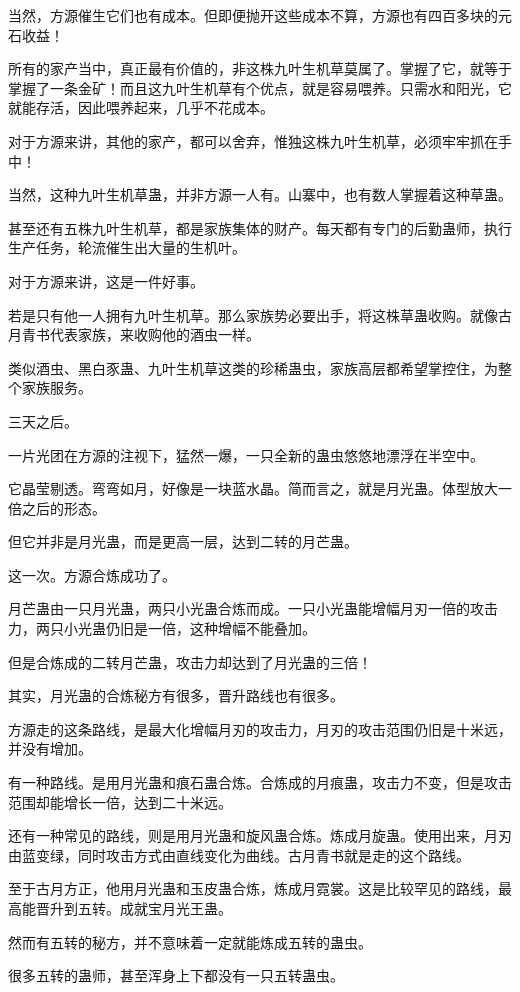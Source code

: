 \begin{this_body}
当然，方源催生它们也有成本。但即便抛开这些成本不算，方源也有四百多块的元石收益！

所有的家产当中，真正最有价值的，非这株九叶生机草莫属了。掌握了它，就等于掌握了一条金矿！而且这九叶生机草有个优点，就是容易喂养。只需水和阳光，它就能存活，因此喂养起来，几乎不花成本。

对于方源来讲，其他的家产，都可以舍弃，惟独这株九叶生机草，必须牢牢抓在手中！

当然，这种九叶生机草蛊，并非方源一人有。山寨中，也有数人掌握着这种草蛊。

甚至还有五株九叶生机草，都是家族集体的财产。每天都有专门的后勤蛊师，执行生产任务，轮流催生出大量的生机叶。

对于方源来讲，这是一件好事。

若是只有他一人拥有九叶生机草。那么家族势必要出手，将这株草蛊收购。就像古月青书代表家族，来收购他的酒虫一样。

类似酒虫、黑白豕蛊、九叶生机草这类的珍稀蛊虫，家族高层都希望掌控住，为整个家族服务。

三天之后。

一片光团在方源的注视下，猛然一爆，一只全新的蛊虫悠悠地漂浮在半空中。

它晶莹剔透。弯弯如月，好像是一块蓝水晶。简而言之，就是月光蛊。体型放大一倍之后的形态。

但它并非是月光蛊，而是更高一层，达到二转的月芒蛊。

这一次。方源合炼成功了。

月芒蛊由一只月光蛊，两只小光蛊合炼而成。一只小光蛊能增幅月刃一倍的攻击力，两只小光蛊仍旧是一倍，这种增幅不能叠加。

但是合炼成的二转月芒蛊，攻击力却达到了月光蛊的三倍！

其实，月光蛊的合炼秘方有很多，晋升路线也有很多。

方源走的这条路线，是最大化增幅月刃的攻击力，月刃的攻击范围仍旧是十米远，并没有增加。

有一种路线。是用月光蛊和痕石蛊合炼。合炼成的月痕蛊，攻击力不变，但是攻击范围却能增长一倍，达到二十米远。

还有一种常见的路线，则是用月光蛊和旋风蛊合炼。炼成月旋蛊。使用出来，月刃由蓝变绿，同时攻击方式由直线变化为曲线。古月青书就是走的这个路线。

至于古月方正，他用月光蛊和玉皮蛊合炼，炼成月霓裳。这是比较罕见的路线，最高能晋升到五转。成就宝月光王蛊。

然而有五转的秘方，并不意味着一定就能炼成五转的蛊虫。

很多五转的蛊师，甚至浑身上下都没有一只五转蛊虫。


\end{this_body}
